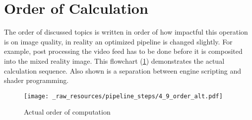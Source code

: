 %
\newpage
\section{Order of Calculation}

The order of discussed topics is written in order of how impactful this 
operation is on image quality, in reality an optimized pipeline is changed 
slightly. For example, post processing the video feed has to be done before it 
is composited into the mixed reality image. This flowchart 
(\ref{fig:steps:order:alt}) demonstrates the actual calculation sequence. Also 
shown is a separation between engine scripting and shader programming.

\begin{figure}[htb]
	\centering
	\texttt{[image: \_raw\_resources/pipeline\_steps/4\_9\_order\_alt.pdf]}
	\caption{Actual order of computation}
	\label{fig:steps:order:alt}
\end{figure}